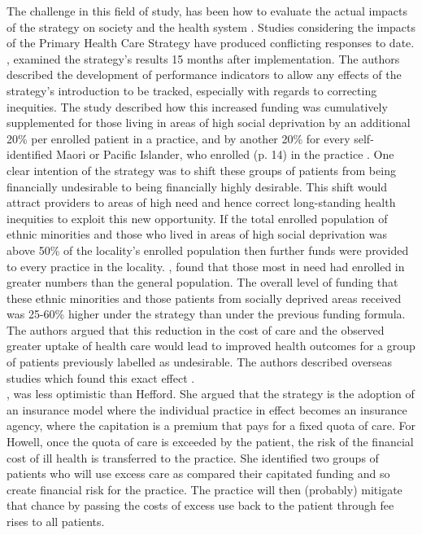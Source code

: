 \documentclass[11pt,a4paper]{article}
\begin{document}
The challenge in this field of study, has been how to evaluate the actual impacts of the strategy on society and the health system \citep{howell2005restructuring}. Studies considering the impacts of the Primary Health Care Strategy \citep{king2001primary} have produced conflicting responses to date. \citet{hefford2005reducing}, examined the strategy's results 15 months after implementation. The authors described the development of performance indicators to allow any effects of the strategy's introduction to be tracked, especially with regards to correcting inequities. The study described  how this increased funding was cumulatively supplemented for those living in areas of high social deprivation by an additional 20\% per enrolled patient in a practice, and by another 20\% for every self-identified Maori or Pacific Islander, who enrolled (p. 14) in the practice \citep{hefford2005reducing}. One clear intention of the strategy was to shift these groups of patients from being financially undesirable to being financially highly desirable. This shift would attract providers to areas of high need and hence correct long-standing health inequities to exploit this new opportunity. If the total enrolled population of ethnic minorities and those who lived in areas of high social deprivation was above 50\% of the locality's enrolled population then further funds were provided to every practice in the locality. \citet{hefford2005reducing}, found that those most in need had enrolled in greater numbers than the general population. The overall level of funding that these ethnic minorities and those patients from socially deprived areas  received was 25-60\% higher under the strategy than under the previous funding formula. The authors argued that this reduction in the cost of care and the observed greater uptake of health care would lead to improved health outcomes for a group of patients previously labelled as undesirable. The authors described overseas studies which found this exact effect \citep{hefford2005reducing}.\\

\citet{howell2005restructuring}, was less optimistic than Hefford. She argued that the strategy is the adoption of an insurance model where the individual practice in effect becomes an insurance agency, where the capitation is a premium that pays for a fixed quota of care. For Howell, once the quota of care is exceeded by the patient, the risk of the financial cost of ill health is transferred to the practice. She identified two groups of patients who will use excess care as compared their capitated funding and so create financial risk for the practice. The practice will then (probably) mitigate that chance by passing the costs of excess use back to the patient through fee rises to all patients.\\
\end{document}
